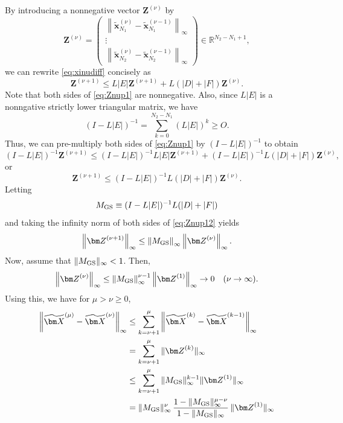 \documentclass[pdflatex,sn-mathphys-num]{sn-jnl}%
\theoremstyle{thmstyleone}%
\theoremstyle{thmstyletwo}%
\theoremstyle{thmstylethree}%
\begin{document}
By introducing a nonnegative vector ${\bm Z}^{(\nu)}$ by
\begin{equation}
{\bm Z}^{(\nu)}=\left(\begin{array}{c}
\left\|\widetilde{\bm x}_{N_1}^{(\nu)}-\widetilde{\bm x}_{N_1}^{(\nu-1)}\right\|_{\infty} \\
\vdots \\
\left\|\widetilde{\bm x}_{N_2}^{(\nu)}-\widetilde{\bm x}_{N_2}^{(\nu-1)}\right\|_{\infty}
\end{array}
\right) \in\mathbb{R}^{N_2-N_1+1},
\end{equation}
we can rewrite \eqref{eq:xinudiff} concisely as
\begin{equation}
{\bm Z}^{(\nu+1)}\le L|E|{\bm Z}^{(\nu+1)}+L(|D|+|F|){\bm Z}^{(\nu)}.
\label{eq:Znup1}
\end{equation}
Note that both sides of \eqref{eq:Znup1} are nonnegative. Also, since $L|E|$ is a nonngative strictly lower triangular matrix, we have
\begin{equation}
(I-L|E|)^{-1}=\sum_{k=0}^{N_2-N_1}(L|E|)^k \ge O.
\end{equation}
Thus, we can pre-multiply both sides of \eqref{eq:Znup1} by $(I-L|E|)^{-1}$ to obtain
\begin{equation}
(I-L|E|)^{-1}{\bm Z}^{(\nu+1)}\le(I-L|E|)^{-1}L|E|{\bm Z}^{(\nu+1)}+(I-L|E|)^{-1}L(|D|+|F|){\bm Z}^{(\nu)},
\end{equation}
or
\begin{equation}
{\bm Z}^{(\nu+1)}\le(I-L|E|)^{-1}L(|D|+|F|){\bm Z}^{(\nu)}.
\label{eq:Znup12}
\end{equation}
Letting
\begin{equation}
M_{\rm GS}\equiv (I-L|E|)^{-1}L(|D|+|F|)
\label{eq:MGSdefinition}
\end{equation}
and taking the infinity norm of both sides of \eqref{eq:Znup12} yields
\begin{equation}
\left\|{\bm Z}^{(\nu+1)}\right\|_{\infty} \le \left\|M_{\rm GS}\right\|_{\infty}\left\|{\bm Z}^{(\nu)}\right\|_{\infty}.
\end{equation}
Now, assume that $\|M_{\rm GS}\|_{\infty}<1$. Then,
\begin{equation}
\left\|{\bm Z}^{(\nu)}\right\|_{\infty} \le \left\|M_{\rm GS}\right\|_{\infty}^{\nu-1}\left\|{\bm Z}^{(1)}\right\|_{\infty} \rightarrow 0 \quad (\nu\rightarrow\infty).
\end{equation}
Using this, we have for $\mu>\nu\ge 0$,
\begin{align}
\left\|\widetilde{\bm X}^{(\mu)}-\widetilde{\bm X}^{(\nu)}\right\|_{\infty} &\le \sum_{k=\nu+1}^{\mu}\left\|\widetilde{\bm X}^{(k)}-\widetilde{\bm X}^{(k-1)}\right\|_{\infty} \nonumber \\
&= \sum_{k=\nu+1}^{\mu}\|{\bm Z}^{(k)}\|_{\infty} \nonumber \\
&\le \sum_{k=\nu+1}^{\mu}\|M_{\rm GS}\|_{\infty}^{k-1}\|{\bm Z}^{(1)}\|_{\infty} \nonumber \\
&= \|M_{\rm GS}\|_{\infty}^{\nu}\,\frac{1-\|M_{\rm GS}\|_{\infty}^{\mu-\nu}}{1-\|M_{\rm GS}\|_{\infty}}\,\|{\bm Z}^{(1)}\|_{\infty}
\label{eq:Cauchy}
\end{align}
\end{document}
